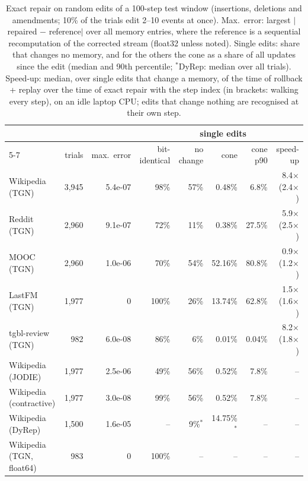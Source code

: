 \begin{table}[t]
\centering\small
\caption{Exact repair on random edits of a 100-step test window (insertions, deletions and amendments; 10\% of the trials edit
2--10 events at once). Max.\ error: largest $|$repaired $-$ reference$|$ over all memory entries, where the reference is a
sequential recomputation of the corrected stream (float32 unless noted). Single edits: share that changes no memory, and
for the others the cone as a share of all updates since the edit (median and 90th percentile; $^\ast$DyRep: median over all
trials). Speed-up: median, over single edits that change a memory, of the time of rollback + replay over the time of exact
repair with the step index (in brackets: walking every step), on an idle laptop CPU; edits that change nothing are
recognised at their own step.}
\label{tab:exact}
\setlength{\tabcolsep}{3.5pt}
\begin{tabular}{@{}lrrrrrrr@{}}
\toprule
 & & & & \multicolumn{3}{c}{single edits} & \\
\cmidrule(lr){5-7}
 & trials & max.\ error & bit-identical & no change & cone & cone p90 & speed-up \\
\midrule
Wikipedia (TGN) & 3,945 & 5.4e-07 & 98\% & 57\% & 0.48\% & 6.8\% & 8.4$\times$ (2.4$\times$) \\
Reddit (TGN) & 2,960 & 9.1e-07 & 72\% & 11\% & 0.38\% & 27.5\% & 5.9$\times$ (2.5$\times$) \\
MOOC (TGN) & 2,960 & 1.0e-06 & 70\% & 54\% & 52.16\% & 80.8\% & 0.9$\times$ (1.2$\times$) \\
LastFM (TGN) & 1,977 & 0 & 100\% & 26\% & 13.74\% & 62.8\% & 1.5$\times$ (1.6$\times$) \\
tgbl-review (TGN) & 982 & 6.0e-08 & 86\% & 6\% & 0.01\% & 0.04\% & 8.2$\times$ (1.8$\times$) \\
Wikipedia (JODIE) & 1,977 & 2.5e-06 & 49\% & 56\% & 0.52\% & 7.8\% & -- \\
Wikipedia (contractive) & 1,977 & 3.0e-08 & 99\% & 56\% & 0.52\% & 7.8\% & -- \\
Wikipedia (DyRep) & 1,500 & 1.6e-05 & -- & 9\%$^\ast$ & 14.75\%$^\ast$ & -- & -- \\
Wikipedia (TGN, float64) & 983 & 0 & 100\% & -- & -- & -- & -- \\
\bottomrule
\end{tabular}
\end{table}
